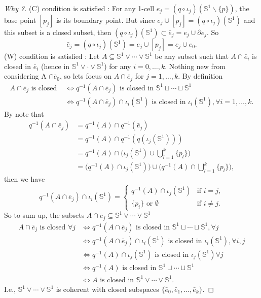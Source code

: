 \documentclass[a4paper]{article}
\theoremstyle{remark}
\newcommand{\s}{\mathbb{S}} %
\newcommand{\doo}{\partial}    %
\newcommand{\subhim}{\subseteq} %
\begin{document}
\begin{proof}[Why ?]
	(C) condition is satisfied : For any 1-cell $e_j = (q\circ \iota_j)(\s^1 \smallsetminus \{p\})$, the base point $[p_j]$ is its boundary point. But since $e_j \cup [p_j] = (q \circ \iota_j)(\s^1)$ and this subset is a closed subset, then $(q \circ \iota_j)(\s^1) \subset \bar{e}_j = e_j \cup \doo e_j$. So 
	$$
	\bar{e}_j = (q \circ \iota_j)(\s^1) = e_j \cup [p_j] = e_j \cup e_0.
    $$
    (W) condition is satisfied : Let $A \subhim \s^1 \vee \cdots \vee \s^1$ be any subset such that $A \cap \bar{e}_i$ is closed in $\bar{e}_i$ (hence in $\s^1 \vee \cdot \vee \s^1$) for any $i =0,\dots,k$. Nothing new from considering A $\cap \bar{e}_0$, so lets focus on $A \cap \bar{e}_j$ for $j =1,\dots,k$. By definition
    \begin{align*}
    A\cap \bar{e}_j \text{ is closed } &\Leftrightarrow q^{-1}(A\cap \bar{e}_j) \text{ is closed in } \s^1 \sqcup \cdots \sqcup \s^1 \\ &\Leftrightarrow q^{-1}(A \cap \bar{e}_j) \cap \iota_i(\s^1) \text{ is closed in }\iota_i(\s^1), \forall i=1,\dots,k.
    \end{align*}
    By note that
    \begin{align*}
    q^{-1}(A \cap \bar{e}_j) &= q^{-1}(A) \cap q^{-1}(\bar{e}_j) \\ &= q^{-1}(A) \cap q^{-1} (q(\iota_j(\s^1))) \\&= q^{-1}(A) \cap \big( \iota_j(\s^1) \cup \bigcup_{l=1}^{k} \{p_l\} \big)\\
    &= \big( q^{-1}(A) \cap \iota_j(\s^1) \big) \cup \big( q^{-1}(A) \cap \bigcup_{l=1}^{k} \{p_l\} \big),
    \end{align*}
    then we have
    \begin{equation*}
    q^{-1}(A \cap \bar{e}_j) \cap \iota_i(\s^1) = \left\{
    \begin{array}{rl}
    q^{-1}(A)\cap \iota_j(\s^1) & \text{if } i=j,\\
    \{p_i\} \text{ or }\emptyset \phantom{XX} & \text{if } i \neq j.
    \end{array} \right.
    \end{equation*}
    So to sum up, the subsets $A \cap \bar{e}_j \subhim \s^1 \vee \cdots \vee \s^1$
    \begin{align*}
     A\cap \bar{e}_j \text{ is closed }\forall j &\Leftrightarrow q^{-1}(A\cap \bar{e}_j) \text{ is closed in } \s^1 \sqcup \cdots \sqcup \s^1, \forall j \\ &\Leftrightarrow q^{-1}(A \cap \bar{e}_j) \cap \iota_i(\s^1) \text{ is closed in }\iota_i(\s^1),  \forall i,j
     \\ &\Leftrightarrow q^{-1}(A)\cap \iota_j(\s^1) \text{ is closed in }\iota_j(\s^1) \forall j
     \\ &\Leftrightarrow q^{-1}(A) \text{ is closed in }\s^1 \sqcup \cdots \sqcup \s^1 \\
     &\Leftrightarrow A \text{ is closed in }\s^1 \vee \cdots \vee \s^1.
    \end{align*}
	I.e., $\s^1 \vee \cdots \vee \s^1$ is coherent with closed subspaces $\{\bar{e}_0,\bar{e}_1,\dots,\bar{e}_k \}$.
\end{proof}
\end{document}
